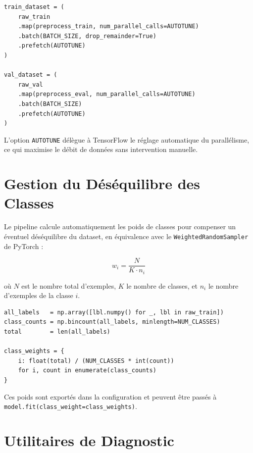 \begin{lstlisting}[caption={Construction des pipelines optimisés tf.data}]
train_dataset = (
    raw_train
    .map(preprocess_train, num_parallel_calls=AUTOTUNE)
    .batch(BATCH_SIZE, drop_remainder=True)
    .prefetch(AUTOTUNE)
)

val_dataset = (
    raw_val
    .map(preprocess_eval, num_parallel_calls=AUTOTUNE)
    .batch(BATCH_SIZE)
    .prefetch(AUTOTUNE)
)
\end{lstlisting}

L'option \texttt{AUTOTUNE} délègue à TensorFlow le réglage automatique du parallélisme, ce qui maximise le débit de données sans intervention manuelle.

\section{Gestion du Déséquilibre des Classes}

Le pipeline calcule automatiquement les poids de classes pour compenser un éventuel déséquilibre du dataset, en équivalence avec le \texttt{WeightedRandomSampler} de PyTorch :

\[
  w_i = \frac{N}{K \cdot n_i}
\]

où $N$ est le nombre total d'exemples, $K$ le nombre de classes, et $n_i$ le nombre d'exemples de la classe $i$.

\begin{lstlisting}[caption={Calcul des poids de classes}]
all_labels   = np.array([lbl.numpy() for _, lbl in raw_train])
class_counts = np.bincount(all_labels, minlength=NUM_CLASSES)
total        = len(all_labels)

class_weights = {
    i: float(total) / (NUM_CLASSES * int(count))
    for i, count in enumerate(class_counts)
}
\end{lstlisting}

Ces poids sont exportés dans la configuration et peuvent être passés à \texttt{model.fit(class\_weight=class\_weights)}.

\section{Utilitaires de Diagnostic}

